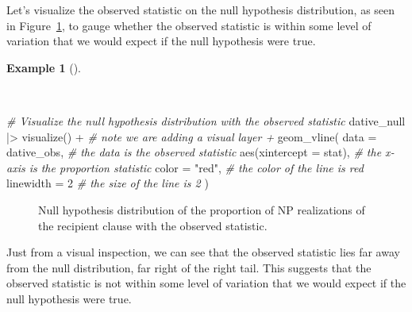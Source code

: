 \documentclass[
  letterpaper,
  DIV=11,
  numbers=noendperiod]{scrreprt}
\newenvironment{Shaded}{\begin{snugshade}}{\end{snugshade}}
\newcommand{\AttributeTok}[1]{\textcolor[rgb]{0.00,0.00,0.00}{#1}}
\newcommand{\CommentTok}[1]{\textcolor[rgb]{0.00,0.00,0.00}{\textit{#1}}}
\newcommand{\DecValTok}[1]{\textcolor[rgb]{0.00,0.00,0.00}{#1}}
\newcommand{\FunctionTok}[1]{\textcolor[rgb]{0.00,0.00,0.00}{#1}}
\newcommand{\NormalTok}[1]{\textcolor[rgb]{0.00,0.00,0.00}{#1}}
\newcommand{\SpecialCharTok}[1]{\textcolor[rgb]{0.00,0.00,0.00}{#1}}
\newcommand{\StringTok}[1]{\textcolor[rgb]{0.00,0.00,0.00}{#1}}
\theoremstyle{definition}
\newtheorem{example}{Example}[chapter]
\theoremstyle{remark}
\begin{document}
Let's visualize the observed statistic on the null hypothesis
distribution, as seen in Figure~\ref{fig-ida-cat-null-hypothesis-obs},
to gauge whether the observed statistic is within some level of
variation that we would expect if the null hypothesis were true.

\begin{example}[]\protect\hypertarget{exm-ida-cat-null-hypothesis-obs}{}\label{exm-ida-cat-null-hypothesis-obs}

~

\begin{Shaded}
\begin{Highlighting}[]
\CommentTok{\# Visualize the null hypothesis distribution with the observed statistic}
\NormalTok{dative\_null }\SpecialCharTok{|\textgreater{}}
  \FunctionTok{visualize}\NormalTok{() }\SpecialCharTok{+} \CommentTok{\# note we are adding a visual layer \textasciigrave{}+\textasciigrave{}}
  \FunctionTok{geom\_vline}\NormalTok{(}
    \AttributeTok{data =}\NormalTok{ dative\_obs,      }\CommentTok{\# the data is the observed statistic}
    \FunctionTok{aes}\NormalTok{(}\AttributeTok{xintercept =}\NormalTok{ stat), }\CommentTok{\# the x{-}axis is the proportion statistic}
    \AttributeTok{color =} \StringTok{"red"}\NormalTok{,          }\CommentTok{\# the color of the line is red}
    \AttributeTok{linewidth =} \DecValTok{2}           \CommentTok{\# the size of the line is 2}
\NormalTok{  )}
\end{Highlighting}
\end{Shaded}

\begin{figure}[H]


\caption{\label{fig-ida-cat-null-hypothesis-obs}Null hypothesis
distribution of the proportion of NP realizations of the recipient
clause with the observed statistic.}

\end{figure}%

\end{example}

Just from a visual inspection, we can see that the observed statistic
lies far away from the null distribution, far right of the right tail.
This suggests that the observed statistic is not within some level of
variation that we would expect if the null hypothesis were true.
\end{document}
